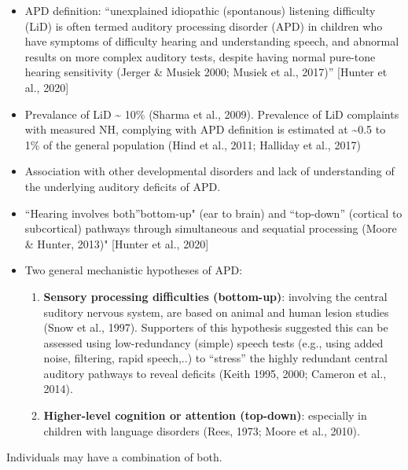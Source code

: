 \documentclass[a4paper, twoside]{templates/ociamthesis}
\providecommand{\tightlist}{%
  \setlength{\itemsep}{0pt}\setlength{\parskip}{0pt}}
\begin{document}
\begin{itemize}
\item
  APD definition: ``unexplained idiopathic (spontanous) listening difficulty (LiD) is often termed auditory processing disorder (APD) in children who have symptoms of difficulty hearing and understanding speech, and abnormal results on more complex auditory tests, despite having normal pure-tone hearing sensitivity (Jerger \& Musiek 2000; Musiek et al., 2017)'' {[}Hunter et al., 2020{]}
\item
  Prevalance of LiD \textasciitilde{} 10\% (Sharma et al., 2009). Prevalence of LiD complaints with measured NH, complying with APD definition is estimated at \textasciitilde0.5 to 1\% of the general population (Hind et al., 2011; Halliday et al., 2017)
\item
  Association with other developmental disorders and lack of understanding of the underlying auditory deficits of APD.
\item
  ``Hearing involves both''bottom-up" (ear to brain) and ``top-down'' (cortical to subcortical) pathways through simultaneous and sequatial processing (Moore \& Hunter, 2013)" {[}Hunter et al., 2020{]}
\item
  Two general mechanistic hypotheses of APD:

  \begin{enumerate}
  \def\labelenumi{(\arabic{enumi})}
  \tightlist
  \item
    \textbf{Sensory processing difficulties (bottom-up)}: involving the central suditory nervous system, are based on animal and human lesion studies (Snow et al., 1997). Supporters of this hypothesis suggested this can be assessed using low-redundancy (simple) speech tests (e.g., using added noise, filtering, rapid speech,..) to ``stress'' the highly redundant central auditory pathways to reveal deficits (Keith 1995, 2000; Cameron et al., 2014).
  \item
    \textbf{Higher-level cognition or attention (top-down)}: especially in children with language disorders (Rees, 1973; Moore et al., 2010).
  \end{enumerate}
\end{itemize}

Individuals may have a combination of both.
\end{document}
